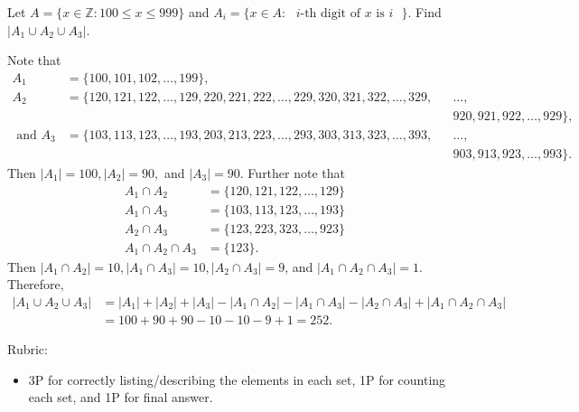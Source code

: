 \documentclass{article}
\theoremstyle{definition}
\begin{document}
\begin{question}{5}
   Let $A = \{ x\in \mathbb{Z} : 100 \leq x \leq 999\}$ and 
   $A_i=\{ x\in A:  \text{ $i$-th digit of $x$ is $i$ }\}$. Find $|A_1\cup A_2\cup A_3|$.
\end{question}
\begin{solution}
Note that 
\begin{align*}
A_1 & = \{ 100, 101, 102, \dots, 199\}, \\
A_2 & = \{  120, 121, 122, \dots, 129,  220, 221, 222, \dots, 229,  320, 321, 322, \dots, 329, && \dots, \\
& && 920, 921, 922, \dots, 929\},\\
\text{ and } A_3 & = \{ 103, 113, 123, \dots, 193, 203, 213, 223, \dots, 293,  303, 313, 323, \dots, 393, && \dots, \\
& && 903, 913, 923, \dots, 993\}.
\end{align*}
Then $|A_1| = 100, |A_2| = 90,$ and $|A_3| = 90$. Further note that
\begin{align*}
A_1 \cap A_2 &= \{ 120, 121, 122, \dots, 129\}\\
A_1 \cap A_3 &= \{ 103, 113, 123, \dots, 193\}\\
A_2 \cap A_3 &= \{ 123, 223, 323, \dots, 923\}\\
A_1 \cap A_2 \cap A_3 &= \{ 123\}.
\end{align*}
Then $|A_1 \cap A_2| = 10, |A_1\cap A_3| = 10, |A_2\cap A_3| = 9$, and $|A_1\cap A_2\cap A_3| = 1$. Therefore, 
\begin{align*}
|A_1\cup A_2\cup A_3| & = |A_1| + |A_2| + |A_3| - |A_1\cap A_2| -|A_1\cap A_3| - |A_2\cap A_3| + |A_1\cap A_2\cap A_3|\\
& = 100 + 90 + 90 -10 - 10 - 9 +1 = 252.
\end{align*}
{\color{red} Rubric:
\begin{itemize}
\item 3P for correctly listing/describing the elements in each set, 1P for counting each set, and 1P for final answer.
\end{itemize}}
\end{solution}
\end{document}
